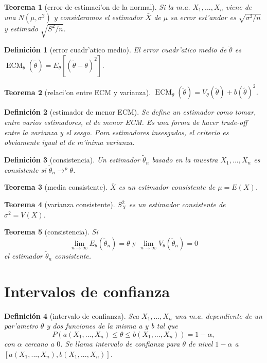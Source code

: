 \documentclass[a4paper,spanish]{article}
\newcommand{\limite}[2]{\lim_{ #1 \rightarrow #2}}
\newcommand{\tiendep}[0]{\longrightarrow^p}
\DeclareMathOperator{\ECM}{ECM}
\newtheorem{teo}{Teorema}
\newtheorem{defi}{Definici\'on}
\begin{document}
\begin{teo}[error de estimaci'on de la normal]
Si la m.a. $X_1,...,X_n$ viene de una $N(\mu,\sigma^2)$ y consideramos el
estimador $\bar{X}$ de $\mu$ su error est'andar es $\sqrt{\sigma^2/n}$ y
estimado $\sqrt{S^2/n}$.
\end{teo}

\begin{defi}[error cuadr'atico medio]
El \emph{error cuadr'atico medio} de $\tilde{\theta}$
es $\ECM_\theta(\tilde{\theta}) = E_\theta[(\tilde{\theta}-\theta)^2]$.
\end{defi}

\begin{teo}[relaci'on entre ECM y varianza]
$\ECM_\theta(\tilde{\theta}) = V_\theta(\tilde{\theta}) + b(\tilde{\theta})^2$.
\end{teo}

\begin{defi}[estimador de menor ECM]
Se define un estimador como tomar, entre varios estimadores, el de menor
ECM. Es una forma de hacer trade-off entre la varianza y el sesgo. Para
estimadores insesgados, el criterio es obviamente igual al de m'inima varianza.
\end{defi}

\begin{defi}[consistencia]
Un estimador $\tilde{\theta}_n$ basado en la muestra $X_1,...,X_n$ es
\emph{consistente} si $\tilde{\theta}_n \tiendep \theta$.
\end{defi}

\begin{teo}[media consistente]
$\bar{X}$ es un estimador consistente de $\mu = E(X)$.
\end{teo}

\begin{teo}[varianza consistente]
$S^2_X$ es un estimador consistente de $\sigma^2 = V(X)$.
\end{teo}

\begin{teo}[consistencia]
Si 
$$\limite{n}{\infty} E_\theta(\tilde{\theta}_n) = \theta \mbox{\ \ y \ \ }
\limite{n}{\infty} V_\theta(\tilde{\theta}_n) = 0$$
el estimador $\tilde{\theta}_n$ consistente.
\end{teo}

\section{Intervalos de confianza}

\begin{defi}[intervalo de confianza]
Sea $X_1,...,X_n$ una m.a. dependiente de un par'ametro $\theta$ y dos
funciones de la misma a y b tal que
$$P(a(X_1,...,X_n) \leq \theta \leq b(X_1,...,X_n)) = 1-\alpha,$$
con $\alpha$ cercano a $0$. Se llama \emph{intervalo de confianza} para 
$\theta$ de nivel $1-\alpha$ a $[a(X_1,...,X_n),b(X_1,...,X_n)]$.
\end{defi}
\end{document}
